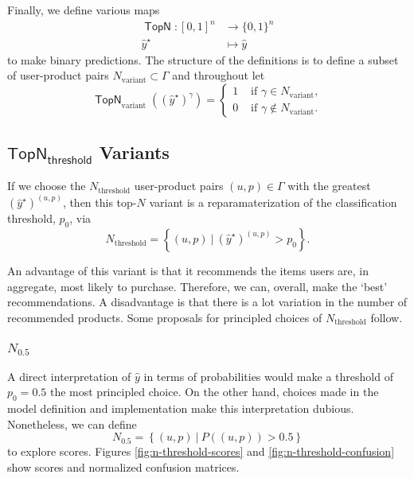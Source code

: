 \documentclass[11pt]{article}
\theoremstyle{definition}
\numberwithin{equation}{section}
\begin{document}
Finally, we define various maps
\begin{equation}\label{eq:TopN}
\begin{aligned}
\operatorname{\mathsf{TopN}} : {[0, 1]}^{n} &\rightarrow \{0, 1\}^n \\ 
\hat{y}^\star  &\mapsto \hat{y}
\end{aligned}
\end{equation}
to make binary predictions. The structure of the definitions is to define a
subset of user-product pairs $N_\text{variant} \subset \Gamma$ and throughout let
\begin{equation}
\operatorname{\mathsf{TopN}}_\text{variant} ((\hat{y}^\star)^\gamma) = 
\begin{cases}
1 & \text{ if } \gamma \in N_\text{variant}, \\
0 & \text{ if } \gamma \not \in N_\text{variant}.
\end{cases}
\end{equation}

    \hypertarget{topn_textthreshold-variants}{%
\subsection{\texorpdfstring{\(\mathsf{TopN_\textsf{threshold}}\)
Variants}{TopN\_\textbackslash{}text\{threshold\} Variants}}\label{topn_textthreshold-variants}}


If we choose the \({N_\text{threshold}}\) user-product pairs \((u,p) \in \Gamma\)
with the greatest \((\hat{y}^\star)^{(u,p)}\), then this top-\(N\) variant is a
reparamaterization of the classification threshold, \(p_0\), via
\[N_\text{threshold} =  \left\{ (u,p) \ | \ (\hat{y}^\star)^{(u,p)} > p_0 \right\}.\]




An advantage of this variant is that it recommends the items users are,
in aggregate, most likely to purchase. Therefore, we can, overall, make
the `best' recommendations. A disadvantage is that there is a lot
variation in the number of recommended products. 
Some proposals for principled choices of \(N_\text{threshold}\) follow.

    \hypertarget{n_0.5}{%
\subsubsection*{\texorpdfstring{\(N_{0.5}\)}{N\_\{0.5\}}}\label{n_0.5}}

A direct interpretation of $\hat{y}$ in terms of
probabilities would make a threshold of \(p_0 = 0.5\) the most
principled choice. On the other hand, choices made in the model
definition and implementation make this interpretation dubious.
Nonetheless, we can define
\[N_{0.5} = \left\{ (u,p) \ | \ P((u,p)) > 0.5 \right\}\]
to explore scores. Figures \ref{fig:n-threshold-scores} and \ref{fig:n-threshold-confusion} show scores and
normalized confusion matrices.
\end{document}
